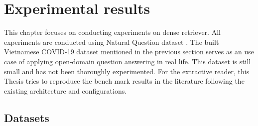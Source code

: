 \documentclass[12pt, sort&compress]{report}
\begin{document}
\chapter{Experimental results}
\label{chap:04}
This chapter focuses on conducting experiments on dense retriever. All experiments are conducted using Natural Question dataset \cite{kwiatkowski2019natural}. The built Vietnamese COVID-19 dataset mentioned in the previous section serves as an use case of applying open-domain question answering in real life. This dataset is still small and has not been thoroughly experimented. For the extractive reader, this Thesis tries to reproduce the bench mark results in the literature following the existing architecture and configurations. 
\section{Datasets}
\label{sec:4.1}
\end{document}
